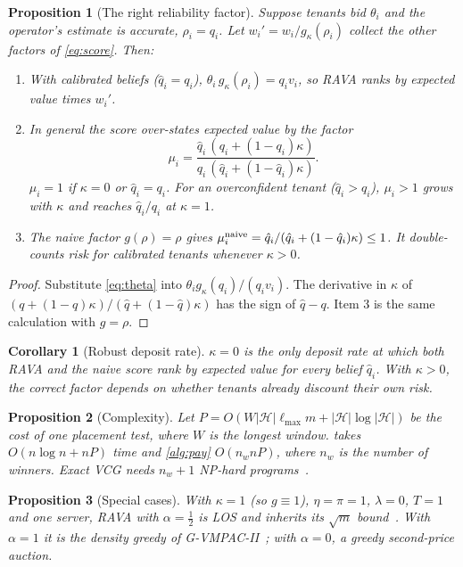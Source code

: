 \documentclass[journal]{IEEEtran}
\newtheorem{proposition}{Proposition}
\newtheorem{corollary}{Corollary}
\theoremstyle{remark}
\begin{document}
\begin{proposition}[The right reliability factor]\label{prop:rank}
Suppose tenants bid $\theta_i$ and the operator's estimate is accurate, $\rho_i=q_i$. Let $w_i'=w_i/g_\kappa(\rho_i)$ collect the other factors of \eqref{eq:score}. Then:
\begin{enumerate}
\item With calibrated beliefs ($\hat q_i=q_i$), $\theta_i\,g_\kappa(\rho_i)=q_iv_i$, so RAVA ranks by expected value times $w_i'$.
\item In general the score over-states expected value by the factor
\begin{equation}\label{eq:mis}
\mu_i=\frac{\hat q_i\,(q_i+(1-q_i)\kappa)}{q_i\,(\hat q_i+(1-\hat q_i)\kappa)}.
\end{equation}
$\mu_i=1$ if $\kappa=0$ or $\hat q_i=q_i$. For an overconfident tenant ($\hat q_i>q_i$), $\mu_i>1$ grows with $\kappa$ and reaches $\hat q_i/q_i$ at $\kappa=1$.
\item The naive factor $g(\rho)=\rho$ gives $\mu_i^{\rm naive}=\hat q_i/(\hat q_i+(1-\hat q_i)\kappa)\le1$. It double-counts risk for calibrated tenants whenever $\kappa>0$.
\end{enumerate}
\end{proposition}
\begin{proof}
Substitute \eqref{eq:theta} into $\theta_ig_\kappa(q_i)/(q_iv_i)$. The derivative in $\kappa$ of $(q+(1-q)\kappa)/(\hat q+(1-\hat q)\kappa)$ has the sign of $\hat q-q$. Item 3 is the same calculation with $g=\rho$.
\end{proof}

\begin{corollary}[Robust deposit rate]\label{cor:kappa0}
$\kappa=0$ is the only deposit rate at which both RAVA and the naive score rank by expected value for \emph{every} belief $\hat q_i$. With $\kappa>0$, the correct factor depends on whether tenants already discount their own risk.
\end{corollary}

\begin{proposition}[Complexity]\label{prop:cx}
Let $P=O(W|\mathcal{H}|\ell_{\max}m+|\mathcal{H}|\log|\mathcal{H}|)$ be the cost of one placement test, where $W$ is the longest window.  takes $O(n\log n+nP)$ time and \cref{alg:pay} $O(n_wnP)$, where $n_w$ is the number of winners. Exact VCG needs $n_w+1$ NP-hard programs~\cite{sandholm2002}.
\end{proposition}

\begin{proposition}[Special cases]\label{prop:special}
With $\kappa=1$ (so $g\equiv1$), $\eta=\pi=1$, $\lambda=0$, $T=1$ and one server, RAVA with $\alpha=\tfrac12$ is LOS and inherits its $\sqrt m$ bound~\cite{lehmann2002}. With $\alpha=1$ it is the density greedy of G-VMPAC-II~\cite{nejad2015}; with $\alpha=0$, a greedy second-price auction.
\end{proposition}
\end{document}
